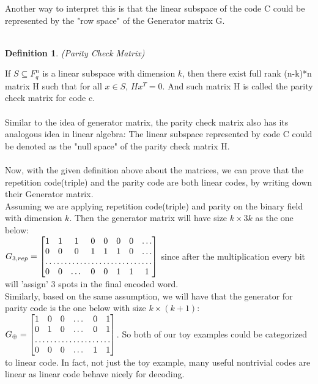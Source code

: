 \documentclass{article}
\newtheorem{Definition}{Definition}
\begin{document}
Another way to interpret this is that the linear subspace of the code C could be represented by the "row space" of the Generator matrix G.\\\\
\begin{Definition}(Parity Check Matrix)\end{Definition}
\noindent If $S \subseteq F_q^n$ is a linear subspace with dimension $k$, then there exist full rank (n-k)*n matrix H such that for all $x \in S$, $Hx^T = 0$. And such matrix H is called the parity check matrix for code c.\\\\
Similar to the idea of generator matrix, the parity check matrix also has its analogous idea in linear algebra: The linear subspace represented by code C could be denoted as the "null space" of the parity check matrix H.\\\\
Now, with the given definition above about the matrices, we can prove that the repetition code(triple) and the parity code are both linear codes, by writing down their Generator matrix.\\
Assuming we are applying repetition code(triple) and parity on the binary field with dimension $k$. Then the generator matrix will have size $k \times 3k$ as the one below:\\
$G_{3,rep} = \begin{bmatrix}
    1 & 1 & 1 & 0 & 0 & 0 & 0 & \dots\\
    0 & 0 & 0 & 1 & 1 & 1 & 0 & \dots \\
    \hdotsfor{8} \\
    0 & 0 & \dots & 0 & 0 & 1 & 1 & 1 \\
\end{bmatrix}$ since after the multiplication every bit will 'assign' 3 spots in the final encoded word. \\
Similarly, based on the same assumption, we will have that the generator for parity code is the one below with size $k \times (k+1) $:\\
$G_\oplus = \begin{bmatrix}
    1 & 0& 0 & \dots & 0 & 1\\
    0 & 1& 0 & \dots & 0 & 1 \\
    \hdotsfor{6} \\
    0 & 0& 0 & \dots & 1 & 1 \\
\end{bmatrix}$. So both of our toy examples could be categorized to linear code. In fact, not just the toy example, many useful nontrivial codes are linear as linear code behave nicely for decoding.
\end{document}
